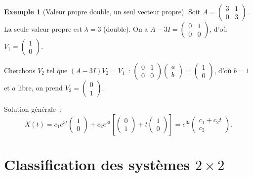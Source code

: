 \documentclass[12pt,a4paper,openany]{book}
\theoremstyle{definition}
\newtheorem{exemple}[definition]{Exemple}
\theoremstyle{plain}
\theoremstyle{remark}
\begin{document}
\begin{exemple}[Valeur propre double, un seul vecteur propre]\label{ex:vp-double}
  Soit $A = \begin{pmatrix} 3 & 1 \\ 0 & 3 \end{pmatrix}$.
  La seule valeur propre est $\lambda = 3$ (double). On a
  $A - 3I = \begin{pmatrix} 0 & 1 \\ 0 & 0 \end{pmatrix}$,
  d'où $V_1 = \begin{pmatrix} 1 \\ 0 \end{pmatrix}$.

  Cherchons $V_2$ tel que $(A - 3I)V_2 = V_1$~:
  $\begin{pmatrix} 0 & 1 \\ 0 & 0 \end{pmatrix}
  \begin{pmatrix} a \\ b \end{pmatrix}
  = \begin{pmatrix} 1 \\ 0 \end{pmatrix}$,
  d'où $b = 1$ et $a$ libre, on prend $V_2 = \begin{pmatrix} 0 \\ 1 \end{pmatrix}$.

  Solution générale~:
  \[
    X(t) = c_1 e^{3t} \begin{pmatrix} 1 \\ 0 \end{pmatrix}
         + c_2 e^{3t} \left[\begin{pmatrix} 0 \\ 1 \end{pmatrix}
           + t\begin{pmatrix} 1 \\ 0 \end{pmatrix}\right]
    = e^{3t} \begin{pmatrix} c_1 + c_2 t \\ c_2 \end{pmatrix}.
  \]
\end{exemple}

\section{Classification des systèmes $2\times 2$}\label{sec:classification-2x2}
\end{document}
